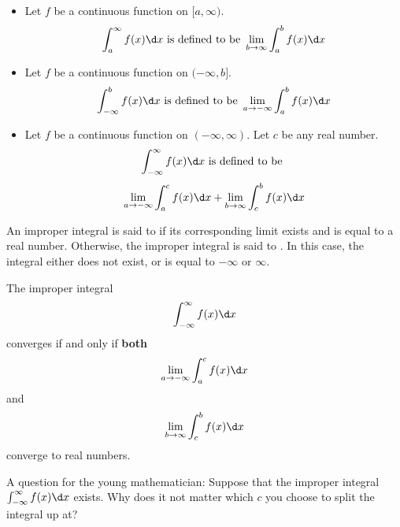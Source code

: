 \documentclass{ximera}
\begin{document}
\begin{definition}\hfil
\begin{itemize}
\item Let $f$ be a continuous function on $[a,\infty)$.
  \[
  \int_a^\infty f(x) \d x \text{ is defined to be } \lim_{b\to\infty}\int_a^b f(x) \d x
  \]
\item Let $f$ be a continuous function on $(-\infty,b]$.
  \[
  \int_{-\infty}^b f(x) \d x \text{ is defined to be } \lim_{a\to-\infty}\int_a^b f(x) \d x
  \]
\item Let $f$ be a continuous function on $(-\infty,\infty)$. Let $c$
  be any real number.
  \[
  \int_{-\infty}^\infty f(x) \d x \text{ is defined to be }
  \]
  \[
  \lim_{a\to-\infty}\int_a^c f(x) \d x + \lim_{b\to\infty}\int_c^b
  f(x) \d x
  \]
\end{itemize}
An improper integral is said to  if its corresponding
limit exists and is equal to a real number. Otherwise, the improper
integral is said to . In this case, the integral either
does not exist, or is equal to $-\infty$ or $\infty$.
\end{definition}

\begin{warning}
  The improper integral
  \[
  \int_{-\infty}^\infty f(x) \d x
  \]
  converges if and only if \textbf{both}
  \[
  \lim_{a\to-\infty}\int_a^c f(x) \d x
  \]
  and
  \[
  \lim_{b\to\infty}\int_c^b
  f(x) \d x
  \]
  converge to real numbers.
\end{warning}

A question for the young mathematician: Suppose that the improper
integral $\int_{-\infty}^\infty f(x) \d x$ exists.  Why does it not
matter which $c$ you choose to split the integral up at?
\end{document}
